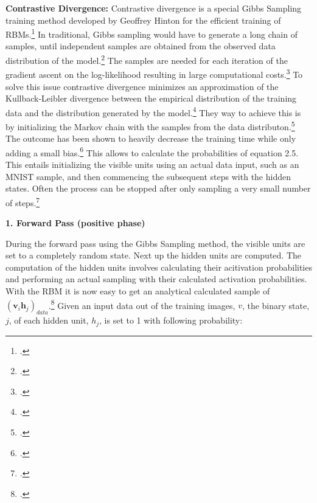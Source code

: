 \textbf{Contrastive Divergence:} Contrastive divergence is a special Gibbs Sampling training method
developed by Geoffrey Hinton for the efficient training of \ac{RBM}s.\footcite[cf.][4-5]{hintonPracticalGuideTraining2012}
In traditional, Gibbs sampling would have to generate a long chain of samples, until
independent samples are obtained from the observed data distribution of the model.\footcite[cf.][5-6]{huembeliPhysicsEnergybasedModels2022}
The samples are needed for each iteration of the gradient ascent on the log-likelihood
resulting in large computational costs.\footcite[cf.][7-8]{upadhyaOverviewRestrictedBoltzmann2019}
To solve this issue contrastive divergence minimizes an approximation of the Kullback-Leibler divergence between the empirical distribution of the training data and the distribution generated by the model.\footcite[cf.][246]{mocanuTopologicalInsightRestricted2016}
They way to achieve this is by initializing the Markov chain with the samples from the data distributon.\footcite[cf.][7-8]{upadhyaOverviewRestrictedBoltzmann2019}
The outcome has been shown to heavily decrease the training time while only adding a small bias.\footcite[cf.][537]{larochelleClassificationUsingDiscriminative2008}
This allows to calculate the probabilities of equation 2.5. 
This entails initializing the visible units using an actual data input, such as an MNIST sample, and then commencing the subsequent steps with the hidden states.
Often the process can be stopped after only sampling a very small number of steps.\footcite[cf.][646]{larochelleLearningAlgorithmsClassification2012}


\textbf{1. Forward Pass (positive phase)}

During the forward pass using the Gibbs Sampling method, the visible units are set to a completely random state. Next up the hidden units are computed.
The computation of the hidden units involves calculating their acitivation probabilities and performing an actual sampling with their calculated activation probabilities.
With the \ac{RBM} it is now easy to get an analytical calculated sample of $(\textbf{v}_i\textbf{h}_j)_{data}$.\footcite[cf.][5]{hintonPracticalGuideTraining2012}
Given an input data out of the training images, \( v \), the binary state, \( j \), of each hidden unit,  \( h_j \), is set to 1 with following probability:

